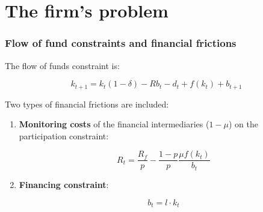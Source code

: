 \documentclass{beamer}
\begin{document}
\section{The firm's problem}
\begin{frame}
    \frametitle{Flow of fund constraints and financial frictions}
The flow of funds constraint is:

    \begin{equation}
        k_{t+1}=k_{t}(1-\delta)- R b_{t} - d_t + f{(k_{t})}+b_{t+1} \label{c1}
    \end{equation}

Two types of financial frictions are included:
\begin{enumerate}
    \item \textbf{Monitoring costs} of the financial intermediaries (\(1-\mu\)) on the participation constraint:

            \begin{equation}
                R_t=\frac{R_f}{p}  -\frac{ 1-p }{ p }\frac{\mu f{(k_{t})}}{b_t} \label{c2}
            \end{equation}

    \item \textbf{Financing constraint}:

        \begin{equation}
            b_t = l \cdot k_t  \label{c3}
        \end{equation}
 
\end{enumerate}

\end{frame}
\end{document}
